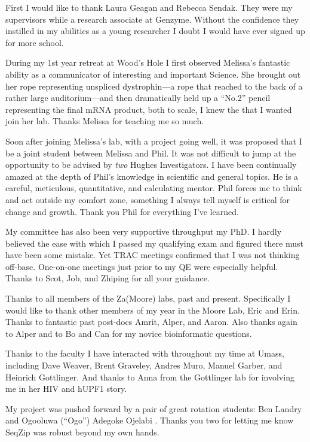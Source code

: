 \acknowledgements{}\label{hd:acknowledgements}

First I would like to thank Laura Geagan and Rebecca Sendak. They were my supervisors while a research associate at Genzyme. Without the confidence they instilled in my abilities as a young researcher I doubt I would have ever signed up for more school.

During my 1st year retreat at Wood’s Hole I first observed Melissa's fantastic ability as a communicator of interesting and important Science. She brought out her rope representing unspliced dystrophin---a rope that reached to the back of a rather large auditorium---and then dramatically held up a ``No.2'' pencil representing the final mRNA product, both to scale, I knew the that I wanted join her lab. Thanks Melissa for teaching me so much.

Soon after joining Melissa’s lab, with a project going well, it was proposed that I be a joint student between Melissa and Phil. It was not difficult to jump at the opportunity to be advised by \textit{two} Hughes Investigators. I have been continually amazed at the depth of Phil’s knowledge in scientific and general topics. He is a careful, meticulous, quantitative, and calculating mentor. Phil forces me to think and act outside my comfort zone, something I always tell myself is critical for change and growth. Thank you Phil for everything I've learned.

My committee has also been very supportive throughput my PhD. I hardly believed the ease with which I passed my qualifying exam and figured there must have been some mistake. Yet TRAC meetings confirmed that I was not thinking off-base. One-on-one meetings just prior to my QE were especially helpful. Thanks to Scot, Job, and Zhiping for all your guidance.

Thanks to all members of the Za(Moore) labs, past and present. Specifically I would like to thank other members of my year in the Moore Lab, Eric and Erin. Thanks to fantastic past post-docs Amrit, Alper, and Aaron. Also thanks again to Alper and to Bo and Can for my novice bioinformatic questions.

Thanks to the faculty I have interacted with throughout my time at Umass, including Dave Weaver, Brent Graveley, Andres Muro, Manuel Garber, and Heinrich Gottlinger. And thanks to Anna from the Gottlinger lab for involving me in her HIV and hUPF1 story.

My project was pushed forward by a pair of great rotation students: Ben Landry and Ogooluwa (``Ogo'') Adegoke Ojelabi . Thanks you two for letting me know SeqZip was robust beyond my own hands.

